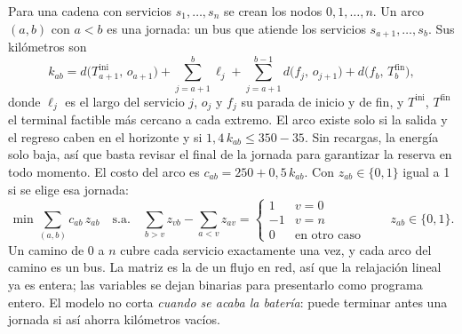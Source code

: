 \documentclass[fontsize=10.5pt,a4paper]{scrartcl}
\begin{document}
Para una cadena con servicios $s_1,\dots,s_n$ se crean los nodos $0,1,\dots,n$. Un arco $(a,b)$ con $a<b$ es una jornada: un bus que atiende los servicios $s_{a+1},\dots,s_b$. Sus kilómetros son
\[
k_{ab} = d\bigl(T^{\text{ini}}_{a+1},\, o_{a+1}\bigr) + \sum_{j=a+1}^{b} \ell_j + \sum_{j=a+1}^{b-1} d\bigl(f_j,\, o_{j+1}\bigr) + d\bigl(f_b,\, T^{\text{fin}}_b\bigr),
\]
donde $\ell_j$ es el largo del servicio $j$, $o_j$ y $f_j$ su parada de inicio y de fin, y $T^{\text{ini}}$, $T^{\text{fin}}$ el terminal factible más cercano a cada extremo. El arco existe solo si la salida y el regreso caben en el horizonte y si $1{,}4\,k_{ab} \le 350-35$. Sin recargas, la energía solo baja, así que basta revisar el final de la jornada para garantizar la reserva en todo momento. El costo del arco es $c_{ab} = 250 + 0{,}5\,k_{ab}$. Con $z_{ab}\in\{0,1\}$ igual a 1 si se elige esa jornada:
\[
\min \sum_{(a,b)} c_{ab}\, z_{ab}
\quad\text{s.a.}\quad
\sum_{b>v} z_{vb} - \sum_{a<v} z_{av} =
\begin{cases} 1 & v=0\\ -1 & v=n\\ 0 & \text{en otro caso}\end{cases}
\qquad z_{ab}\in\{0,1\}.
\]
Un camino de 0 a $n$ cubre cada servicio exactamente una vez, y cada arco del camino es un bus. La matriz es la de un flujo en red, así que la relajación lineal ya es entera; las variables se dejan binarias para presentarlo como programa entero. El modelo no corta \emph{cuando se acaba la batería}: puede terminar antes una jornada si así ahorra kilómetros vacíos.
\end{document}
